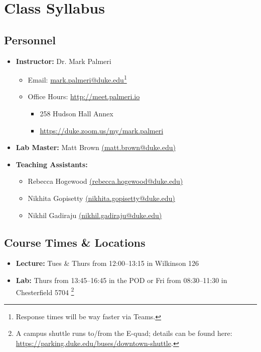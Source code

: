 \documentclass[10pt]{report}
\begin{document}
\section*{Class Syllabus}

\subsection*{Personnel}
\begin{itemize}
    \item[] \textbf{Instructor:} Dr. Mark Palmeri
    \begin{itemize}
        \item Email: \href{mailto:mark.palmeri@duke.edu}{mark.palmeri@duke.edu}\footnote{Response times will be way
        faster via Teams.}
        \item Office Hours: \url{http://meet.palmeri.io}
        \begin{itemize}
            \item 258 Hudson Hall Annex
            \item \url{https://duke.zoom.us/my/mark.palmeri}
        \end{itemize}
    \end{itemize}
    \item[] \textbf{Lab Master:} Matt Brown \href{mailto:matt.brown@duke.edu}{(matt.brown@duke.edu)}
    \item[] \textbf{Teaching Assistants:} 
    \begin{itemize}
        \item Rebecca Hogewood \href{mailto:rebecca.hogewood@duke.edu}{(rebecca.hogewood@duke.edu)}
        \item Nikhita Gopisetty \href{mailto:nikhita.gopisetty@duke.edu}{(nikhita.gopisetty@duke.edu)}  
        \item Nikhil Gadiraju \href{mailto:nikhil.gadiraju@duke.edu}{(nikhil.gadiraju@duke.edu)}
    \end{itemize}
\end{itemize}

\subsection*{Course Times \& Locations}
\begin{itemize}
    \item[] \textbf{Lecture:} Tues \& Thurs from 12:00--13:15 in Wilkinson 126

    \item[] \textbf{Lab:} Thurs from 13:45--16:45 in the POD or Fri from 08:30--11:30 in Chesterfield 5704
    \footnote{A campus shuttle runs to/from the E-quad; details can be found here:
\url{https://parking.duke.edu/buses/downtown-shuttle}.}
\end{itemize}
\end{document}
